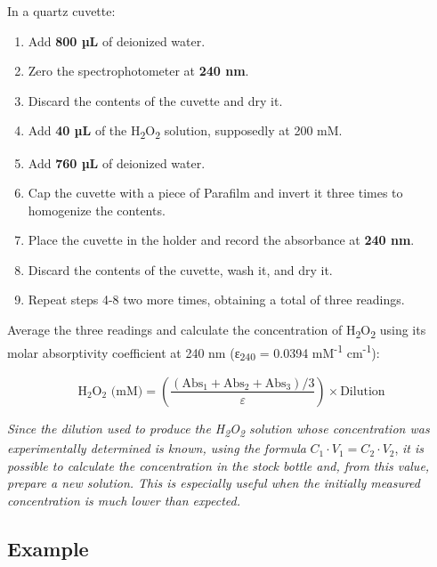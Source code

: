 \documentclass[
  9pt,
  american,
  a5paper,
  extrafontsizes,onecolumn,openright
  ]{memoir}
\providecommand{\tightlist}{%
  \setlength{\itemsep}{0pt}\setlength{\parskip}{0pt}}
\begin{document}
In a quartz cuvette:

\begin{enumerate}
\def\labelenumi{\arabic{enumi}.}
\tightlist
\item
  Add \textbf{800 µL} of deionized water.
\item
  Zero the spectrophotometer at \textbf{240 nm}.
\item
  Discard the contents of the cuvette and dry it.
\item
  Add \textbf{40 µL} of the H\textsubscript{2}O\textsubscript{2} solution, supposedly at 200 mM.
\item
  Add \textbf{760 µL} of deionized water.
\item
  Cap the cuvette with a piece of Parafilm and invert it three times to homogenize the contents.
\item
  Place the cuvette in the holder and record the absorbance at \textbf{240 nm}.
\item
  Discard the contents of the cuvette, wash it, and dry it.
\item
  Repeat steps 4-8 two more times, obtaining a total of three readings.
\end{enumerate}

Average the three readings and calculate the concentration of H\textsubscript{2}O\textsubscript{2} using its molar absorptivity coefficient at 240 nm (ε\textsubscript{240} = 0.0394 mM\textsuperscript{-1} cm\textsuperscript{-1}):

\[\text{H}_2\text{O}_2 \text{ (mM)} = \left( \frac{\left( \text{Abs}_1 + \text{Abs}_2 + \text{Abs}_3 \right) / 3}{\varepsilon} \right) \times \text{Dilution}\]

\begin{greybox}[frametitle = Note]
\emph{Since the dilution used to produce the H\textsubscript{2}O\textsubscript{2} solution whose concentration was experimentally determined is known, using the formula} \(C_1 \cdot V_1 = C_2 \cdot V_2\), \emph{it is possible to calculate the concentration in the stock bottle and, from this value, prepare a new solution. This is especially useful when the initially measured concentration is much lower than expected.}

\end{greybox}

\subsection{Example}\label{example}
\end{document}
